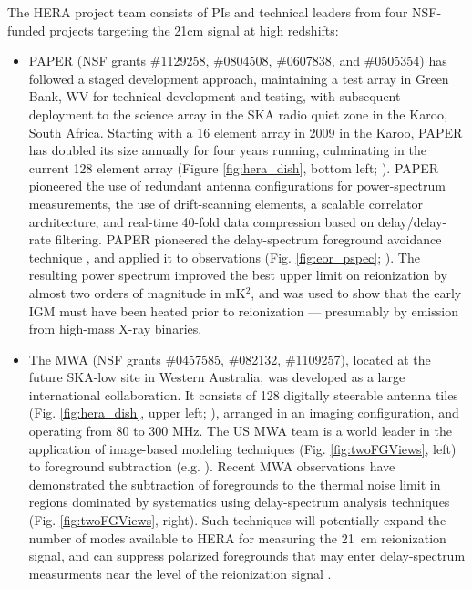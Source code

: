\documentclass[preprint]{aastex}
\begin{document}
The HERA project team consists of PIs and technical leaders from four NSF-funded projects targeting the 21cm signal
at high redshifts:
\begin{itemize}[noitemsep,nolistsep]

\item{PAPER} (NSF grants \#1129258, \#0804508, \#0607838, and \#0505354) has followed a
staged development approach, maintaining a test array in Green Bank, WV for technical development and testing, with subsequent 
deployment to the science array in the SKA radio quiet zone in the Karoo, South Africa.  Starting with a 16 element
array in 2009 in the Karoo, PAPER has doubled its size annually for four years running, culminating in the current
128 element array (Figure \ref{fig:hera_dish}, bottom left; \citealt{parsons_et_al2012a}).
PAPER pioneered the use of redundant antenna configurations
for power-spectrum measurements, the use of drift-scanning elements,
a scalable correlator architecture,
and real-time 40-fold data compression based on delay/delay-rate filtering.
PAPER pioneered the delay-spectrum foreground avoidance technique \citep{parsons_et_al2012b},
and applied it to observations (Fig. \ref{fig:eor_pspec}; \citealt{parsons_et_al2013}).
The resulting power spectrum improved the best upper
limit on reionization by almost two orders of magnitude in mK$^2$, and was used to show that the early IGM must have
been heated prior to reionization --- presumably by emission from high-mass X-ray binaries.

\item{The MWA} (NSF grants \#0457585, \#082132, \#1109257), 
located at the future SKA-low site
in Western Australia, was developed as a large international collaboration.  It consists
of 128 digitally steerable antenna tiles (Fig. \ref{fig:hera_dish}, upper left;
\citealt{tingay_et_al2013_trunc}), arranged in an imaging configuration, and operating from 80 to 300 MHz.
The US MWA team is a world leader in the application of image-based modeling techniques 
(Fig. \ref{fig:twoFGViews}, left) to
foreground subtraction (e.g. \citealt{hazelton_et_al2013,morales_et_al2006a}). %
Recent MWA observations have
demonstrated the subtraction of foregrounds to the thermal noise limit in regions dominated by systematics using
delay-spectrum analysis techniques (Fig. \ref{fig:twoFGViews}, right).
Such techniques will potentially
expand the number of modes available to HERA for measuring the 21~cm reionization signal,
and can suppress polarized foregrounds that may enter delay-spectrum measurments near
the level of the reionization signal \citep{moore_et_al2013}. 


\end{itemize}
\end{document}

